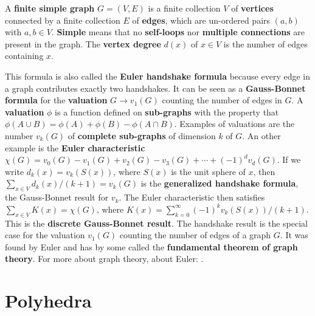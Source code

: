 \documentclass[12pt]{amsart}
\def\satz#1{ \vspace{2mm} \begin{center} \fcolorbox{yellow1}{yellow1}{ \parbox{14.0cm}{{\bf Theorem:} #1}} \vspace{2mm} \end{center} }
\newcounter{example}    \def\example#1{ \item \fontsize{12}{15} \selectfont #1 \fontsize{12}{15} \selectfont }
\begin{document}
A {\bf finite simple graph} $G=(V,E)$ is a finite collection $V$ of {\bf vertices} connected by a 
finite collection $E$ of {\bf edges}, which are un-ordered pairs $(a,b)$ with $a,b \in V$. 
{\bf Simple} means that no {\bf self-loops} nor {\bf multiple connections} are present in the graph.
The {\bf vertex degree} $d(x)$ of $x \in V$ is the number of edges containing $x$. 

\satz{
$\sum_{x \in V} d(x)/2 = |E|$.
}

This formula is also called the {\bf Euler handshake formula} because every edge in a graph 
contributes exactly two handshakes. It can be seen as a {\bf Gauss-Bonnet formula} for the {\bf valuation}
$G \to v_1(G)$ counting the number of edges in $G$. A {\bf valuation} $\phi$ is a function defined on 
{\bf sub-graphs} with the property that $\phi(A \cup B) = \phi(A) + \phi(B) - \phi(A \cap B)$. 
Examples of valuations are the number $v_k(G)$ of {\bf complete sub-graphs} of dimension $k$ of $G$. 
An other example is the {\bf Euler characteristic} $\chi(G)=v_0(G)-v_1(G)+v_2(G)-v_3(G)+ \cdots + (-1)^d v_d(G)$.
If we write $d_k(x)=v_k(S(x))$, where $S(x)$ is the unit sphere of $x$, then 
$\sum_{x \in V} d_k(x)/(k+1) = v_k(G)$ is the {\bf generalized handshake formula}, the Gauss-Bonnet
result for $v_k$. The Euler characteristic then satisfies $\sum_{x \in V} K(x) = \chi(G)$, 
where $K(x) = \sum_{k=0}^{\infty} (-1)^k v_k(S(x))/(k+1)$. 
This is the {\bf discrete Gauss-Bonnet result}. The handshake result is the special case for the 
valuation $v_1(G)$ counting the number of edges of a graph $G$. 
It was found by Euler and has by some called the {\bf fundamental theorem of graph theory}.
For more about graph theory, \cite{BM,Merris,BR,handbookgraph} about Euler: \cite{Fellmann}. 


\section{Polyhedra}
\end{document}
